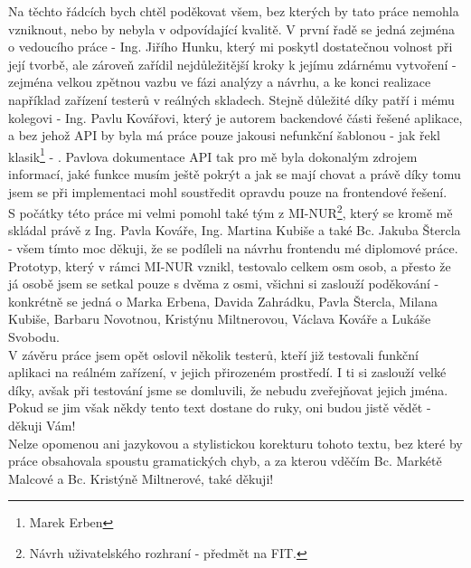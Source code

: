 Na těchto řádcích bych chtěl poděkovat všem, bez kterých by tato práce nemohla vzniknout, nebo by nebyla v odpovídající kvalitě. V první řadě se jedná zejména o vedoucího práce - Ing. Jiřího Hunku, který mi poskytl dostatečnou volnost při její tvorbě, ale zároveň zařídil nejdůležitější kroky k jejímu zdárnému vytvoření - zejména velkou zpětnou vazbu ve fázi analýzy a návrhu, a ke konci realizace například zařízení testerů v reálných skladech. Stejně důležité díky patří i mému kolegovi - Ing. Pavlu Kovářovi, který je autorem backendové části řešené aplikace, a bez jehož API by byla má práce pouze jakousi nefunkční šablonou - jak řekl klasik\footnote{Marek Erben} - . Pavlova dokumentace API tak pro mě byla dokonalým zdrojem informací, jaké funkce musím ještě pokrýt a jak se mají chovat a právě díky tomu jsem se při implementaci mohl soustředit opravdu pouze na frontendové řešení.\\
S počátky této práce mi velmi pomohl také tým z MI-NUR\footnote{Návrh uživatelského rozhraní - předmět na FIT.}, který se kromě mě skládal právě z Ing. Pavla Kováře, Ing. Martina Kubiše a také Bc. Jakuba Štercla - všem tímto moc děkuji, že se podíleli na návrhu frontendu mé diplomové práce. Prototyp, který v rámci MI-NUR vznikl, testovalo celkem osm osob, a přesto že já osobě jsem se setkal pouze s dvěma z osmi, všichni si zaslouží poděkování - konkrétně se jedná o Marka Erbena, Davida Zahrádku, Pavla Štercla, Milana Kubiše, Barbaru Novotnou, Kristýnu Miltnerovou, Václava Kováře a Lukáše Svobodu.\\
V závěru práce jsem opět oslovil několik testerů, kteří již testovali funkční aplikaci na reálném zařízení, v jejich přirozeném prostředí. I ti si zaslouží velké díky, avšak při testování jsme se domluvili, že nebudu zveřejňovat jejich jména. Pokud se jim však někdy tento text dostane do ruky, oni budou jistě vědět - děkuji Vám!\\
Nelze opomenou ani jazykovou a stylistickou korekturu tohoto textu, bez které by práce obsahovala spoustu gramatických chyb, a za kterou vděčím Bc. Markétě Malcové a Bc. Kristýně Miltnerové, také děkuji!
